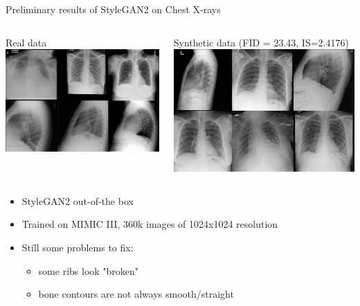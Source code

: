 \documentclass[8pt,xcolor=table,aspectratio=169]{beamer}
\begin{document}
\begin{frame}{Preliminary results of StyleGAN2 on Chest X-rays}
\begin{columns}
\begin{column}{0.5\textwidth}
\centering
Real data
\includegraphics[width=\textwidth]{hhpMkd8.png}
\end{column}
\begin{column}{0.5\textwidth}
\centering
Synthetic data (FID = 23.43, IS=2.4176) %
\includegraphics[width=\textwidth]{Z0XeRg3.jpg} %
\end{column}
\end{columns}

\begin{itemize}
\item StyleGAN2 out-of-the box
\item Trained on MIMIC III, 360k images of 1024x1024 resolution
\item Still some problems to fix:
  \begin{itemize}
  \item some ribs look "broken"
  \item bone contours are not always smooth/straight
  \end{itemize}
\end{itemize}
\vspace{1em}

\end{frame}
\end{document}
